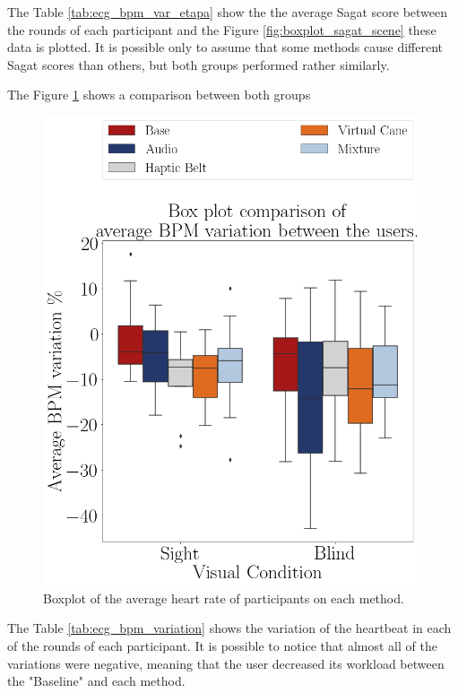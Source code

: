 The Table \ref{tab:ecg_bpm_var_etapa} show the the average Sagat score between the rounds of each participant and the Figure \ref{fig:boxplot_sagat_scene} these data is plotted. It is possible only to assume that some methods cause different Sagat scores than others, but both groups performed rather similarly.



The Figure \ref{fig:boxplot_ecg_bpm_scene} shows a comparison between both groups

\begin{figure}[!htb]
    \centering
    \includegraphics[width = 0.5\linewidth]{Resultados/ECG/Figuras/png/boxplot_ecg_bpm_scene.png}
    \caption{Boxplot of the average heart rate of participants on each method.}
    \label{fig:boxplot_ecg_bpm_scene}
\end{figure}

The Table \ref{tab:ecg_bpm_variation} shows the variation of the heartbeat in each of the rounds of each participant. It is possible to notice that almost all of the variations were negative, meaning that the user decreased its workload between the "Baseline" and each method.


